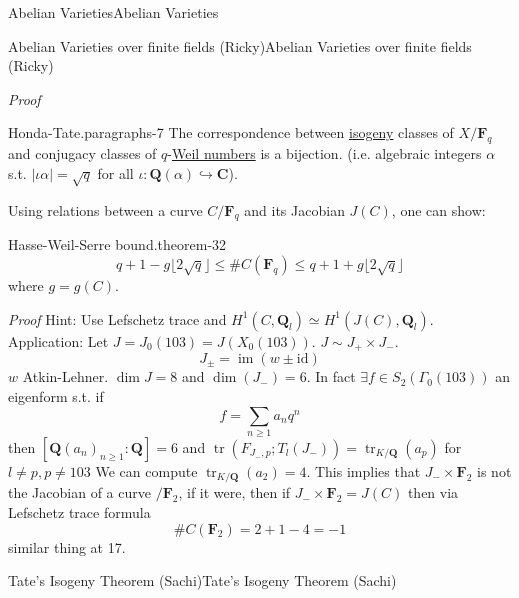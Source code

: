 \documentclass[10pt,]{book}
\makeatletter
\renewcommand*{\proofname}{Proof}
\renewenvironment{proof}[1][\proofname]{\par
  \pushQED{\qed}%
  \normalfont \topsep6\p@\@plus6\p@\relax
  \trivlist
  \item\relax
    {\itshape
    #1\@addpunct{.}}\hspace\labelsep\ignorespaces
}{%
  \popQED\endtrivlist\@endpefalse
}
\numberwithin{equation}{section}
\newcommand{\lb}{[}
\newcommand{\rb}{]}
\newcommand{\QQ}{\mathbf{Q}}
\newcommand{\CC}{\mathbf{C}}
\newcommand{\FF}{\mathbf{F}}
\newcommand{\id}{\mathrm{id}}
\DeclareMathOperator{\im}{im}
\DeclareMathOperator{\tr}{tr}
\makeatother
\begin{document}
\begin{chapterptx}{Abelian Varieties}{}{Abelian Varieties}{}{}
\begin{sectionptx}{Abelian Varieties over finite fields (Ricky)}{}{Abelian Varieties over finite fields (Ricky)}{}{}
\begin{proof}
\end{proof}
\begin{paragraphs}{Honda-Tate.}{paragraphs-7}%
\hypertarget{p-371}{}%
The correspondence between \hyperref[def-supersing-isog-isog]{isogeny} classes of \(X/\FF_q\) and conjugacy classes of \(q\)-\hyperref[sec-honda-tate]{Weil numbers} is a bijection. (i.e. algebraic integers \(\alpha\) s.t. \(|\iota \alpha| = \sqrt q\) for all \(\iota \colon \QQ(\alpha) \hookrightarrow \CC\)).%
\end{paragraphs}%
\par
\hypertarget{p-372}{}%
Using relations between a curve \(C/\FF_q\) and its Jacobian \(J(C) \), one can show:%
\begin{theorem}{Hasse-Weil-Serre bound.}{}{theorem-32}%
\hypertarget{p-373}{}%
%
\begin{equation*}
q + 1 - g\lfloor 2\sqrt q\rfloor \le \#C(\FF_{q}) \le q + 1 + g\lfloor 2\sqrt q\rfloor
\end{equation*}
where \(g=  g(C)\).%
\end{theorem}
\begin{proof}\hypertarget{proof-63}{}
\hypertarget{p-374}{}%
Hint: Use Lefschetz trace and \(H^1(C, \QQ_l) \simeq H^1(J(C) , \QQ_l)\).%
\end{proof}
\hypertarget{p-375}{}%
Application: Let \(J = J_0(103) = J(X_0(103))\). \(J\sim J_+ \times J_-\).%
\begin{equation*}
J_{\pm} = \im(w \pm \id)
\end{equation*}
\(w\) Atkin-Lehner. \(\dim J = 8\) and \(\dim(J_-) = 6\). In fact \(\exists f\in  S_2( \Gamma_0(103))\) an eigenform s.t. if%
\begin{equation*}
f=\sum_{n\ge 1} a_n q^n
\end{equation*}
then \(\lb \QQ(a_n)_{n \ge 1}: \QQ\rb =6\) and \(\tr( F_{J_-,p};  T_l(J_-)) = \tr_{K/\QQ}(a_p)\)  for \(l \ne p, p\ne 103\) We can compute \(\tr_{K/\QQ} ( a_2) = 4\). This implies that \(J_- \times \FF_2\) is not the Jacobian of a curve \(/\FF_2\), if it were, then  if \(J_- \times \FF_2 = J(C)\) then via Lefschetz trace formula%
\begin{equation*}
\#C(\FF_2) = 2+1 - 4 = -1
\end{equation*}
similar thing at 17.%
\end{sectionptx}
%
%
\typeout{************************************************}
\typeout{************************************************}
%
\begin{sectionptx}{Tate's Isogeny Theorem (Sachi)}{}{Tate's Isogeny Theorem (Sachi)}{}{}\label{sec-tate-thm}

\end{sectionptx}
\end{chapterptx}
\end{document}
